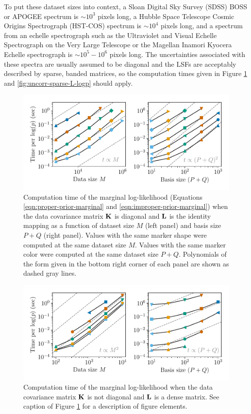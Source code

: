 \documentclass[manuscript]{aastex62}
\newcommand{\vx}[1]{{\bf {#1}}}
\begin{document}
To put these dataset sizes into context, a Sloan Digital Sky Survey (SDSS) BOSS or APOGEE spectrum is $\sim 10^3$ pixels long, a Hubble Space Telescope Cosmic Origins Spectrograph (HST-COS) spectrum is $\sim 10^4$ pixels long, and a spectrum from an echelle spectrograph such as the Ultraviolet and Visual Echelle Spectrograph on the Very Large Telescope or the Magellan Inamori Kyocera Echelle spectrograph is $\sim 10^5 - 10^6$ pixels long.
The uncertainties associated with these spectra are usually assumed to be diagonal and the LSFs are acceptably described by sparse, banded matrices, so the computation times given in Figure \ref{fig:uncorr-no-L-logp} and \ref{fig:uncorr-sparse-L-logp} should apply.

\begin{figure}
  \includegraphics{uncorr_no_L_scaling.pdf}
  \caption{Computation time of the marginal log-likelihood (Equations \ref{eqn:proper-prior-marginal} and \ref{eqn:improper-prior-marginal}) when the data covariance matrix $\vx{K}$ is diagonal and $\vx{L}$ is the identity mapping as a function of dataset size $M$ (left panel) and basis size $P+Q$ (right panel). Values with the same marker shape were computed at the same dataset size $M$. Values with the same marker color were computed at the same dataset size $P+Q$. Polynomials of the form given in the bottom right corner of each panel are shown as dashed gray lines.}
  \label{fig:uncorr-no-L-logp}
\end{figure}

\begin{figure}
  \includegraphics{corr_yes_L_scaling.pdf}
  \caption{Computation time of the marginal log-likelihood when the data covariance matrix $\vx{K}$ is not diagonal and $\vx{L}$ is a dense matrix. See caption of Figure \ref{fig:uncorr-no-L-logp} for a description of figure elements.}
  \label{fig:corr-yes-L-logp}
\end{figure}
\end{document}
